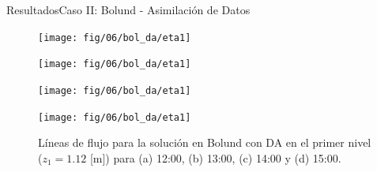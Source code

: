 \documentclass[mathserif,10pt]{beamer}
\begin{document}
\begin{frame}{Resultados}{Caso II: Bolund - Asimilación de Datos}
	\begin{figure}[H]
		\begin{minipage}{0.5\linewidth}
			\centering
			\texttt{[image: fig/06/bol\_da/eta1]}%
		\end{minipage}%
		\begin{minipage}{0.5\linewidth}
			\centering
			\texttt{[image: fig/06/bol\_da/eta1]}%
		\end{minipage}%
		\vspace{1mm}
		
		\begin{minipage}{0.5\linewidth}
			\centering
			\texttt{[image: fig/06/bol\_da/eta1]}%
		\end{minipage}%
		\begin{minipage}{0.5\linewidth}
			\centering
			\texttt{[image: fig/06/bol\_da/eta1]}%
		\end{minipage}%
		\caption{Líneas de flujo para la solución en Bolund con DA en el primer nivel ($z_1 = 1.12$ [m]) para (a) 12:00, (b) 13:00, (c) 14:00 y (d) 15:00.}
		\label{fig:06_bol_da_st}
	\end{figure}
\end{frame}
\end{document}
